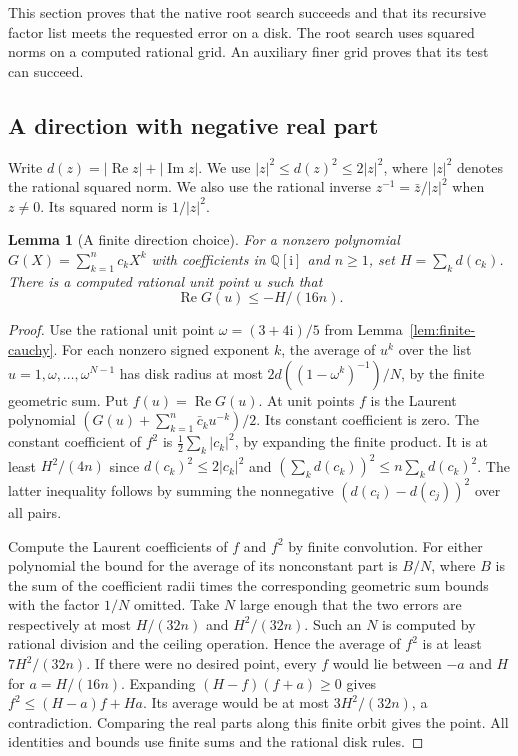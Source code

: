 \documentclass[11pt]{amsart}
\newtheorem{lemma}[theorem]{Lemma}
\theoremstyle{definition}
\theoremstyle{remark}
\numberwithin{equation}{section}
\newcommand{\QQi}{\mathbb Q[\mathrm i]}
\newcommand{\re}{\operatorname{Re}}
\newcommand{\im}{\operatorname{Im}}
\begin{document}
This section proves that the native root search succeeds and
that its recursive factor list meets the requested error on a
disk. The root search uses squared norms on a computed rational
grid. An auxiliary finer grid proves that its test can succeed.

\subsection{A direction with negative real part}

Write $d(z)=|\re z|+|\im z|$. We use
$|z|^2\le d(z)^2\le 2|z|^2$, where $|z|^2$ denotes the
rational squared norm. We also use the rational inverse
$z^{-1}=\bar z/|z|^2$ when $z\ne0$. Its squared norm is
$1/|z|^2$.

\begin{lemma}[A finite direction choice]\label{lem:negative-direction}
For a nonzero polynomial $G(X)=\sum_{k=1}^n c_k X^k$
with coefficients in $\QQi$ and $n\ge1$, set $H=\sum_k d(c_k)$.
There is a computed rational unit point $u$ such that
\[
    \re G(u)\le -H/(16n).
\]
\end{lemma}
\begin{proof}
Use the rational unit point $\omega=(3+4\mathrm i)/5$ from
Lemma~\ref{lem:finite-cauchy}. For each nonzero signed exponent
$k$, the average of $u^k$ over the list
$u=1,\omega,\ldots,\omega^{N-1}$ has disk radius at most
$2d((1-\omega^k)^{-1})/N$, by the finite geometric sum.
Put $f(u)=\re G(u)$. At unit points $f$ is the Laurent
polynomial $(G(u)+\sum_{k=1}^n\bar c_k u^{-k})/2$.
Its constant coefficient is zero. The constant coefficient
of $f^2$ is $\tfrac12\sum_k |c_k|^2$, by expanding the finite
product. It is at least $H^2/(4n)$ since
$d(c_k)^2\le2|c_k|^2$ and $(\sum_k d(c_k))^2\le n\sum_k d(c_k)^2$.
The latter inequality follows by summing the nonnegative
$(d(c_i)-d(c_j))^2$ over all pairs.

Compute the Laurent coefficients of $f$ and $f^2$ by finite
convolution. For either polynomial the bound for the average
of its nonconstant part is $B/N$, where $B$ is the sum of the
coefficient radii times the corresponding geometric sum bounds
with the factor $1/N$ omitted. Take $N$ large enough that the
two errors are respectively at most $H/(32n)$ and $H^2/(32n)$.
Such an $N$ is computed by rational division and the ceiling
operation. Hence the average of $f^2$ is at least $7H^2/(32n)$.
If there were no desired point, every $f$ would lie between
$-a$ and $H$ for $a=H/(16n)$. Expanding $(H-f)(f+a)\ge0$
gives $f^2\le(H-a)f+Ha$. Its average would be at most
$3H^2/(32n)$, a contradiction. Comparing the real parts along
this finite orbit gives the point. All identities and bounds
use finite sums and the rational disk rules.
\end{proof}
\end{document}
